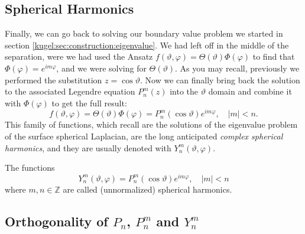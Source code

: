\subsection{Spherical Harmonics}

Finally, we can go back to solving our boundary value problem we started in
section \ref{kugel:sec:construction:eigenvalue}. We had left off in the middle
of the separation, were we had used the Ansatz $f(\vartheta, \varphi) =
\Theta(\vartheta) \Phi(\varphi)$ to find that $\Phi(\varphi) = e^{im\varphi}$,
and we were solving for $\Theta(\vartheta)$.  As you may recall, previously we
performed the substitution $z = \cos \vartheta$. Now we can finally bring back the
solution to the associated Legendre equation $P^m_n(z)$ into the $\vartheta$
domain and combine it with $\Phi(\varphi)$ to get the full result:
\begin{equation*}
    f(\vartheta, \varphi)
      = \Theta(\vartheta)\Phi(\varphi)
      = P^m_n (\cos \vartheta) e^{im\varphi}, \quad |m|<n.
\end{equation*}
This family of functions, which recall are the solutions of the eigenvalue
problem of the surface spherical Laplacian, are the long anticipated
\emph{complex spherical harmonics}, and they are usually denoted with
$Y^m_n(\vartheta, \varphi)$.

\begin{definition}
  \label{kugel:def:spherical-harmonics}
  The functions
  \begin{equation*}
    Y^m_n (\vartheta, \varphi) = P^m_n(\cos \vartheta) e^{im\varphi}, \quad |m|<n
  \end{equation*}
  where $m, n \in \mathbb{Z}$ are called (unnormalized) spherical
  harmonics.
\end{definition}

\begin{figure}
  \centering
  \kugelplaceholderfig{\textwidth}{.8\paperheight}
  \caption{
    \label{kugel:fig:spherical-harmonics}
  }
\end{figure}


\subsection{Orthogonality of $P_n$, $P^m_n$ and $Y^m_n$}

